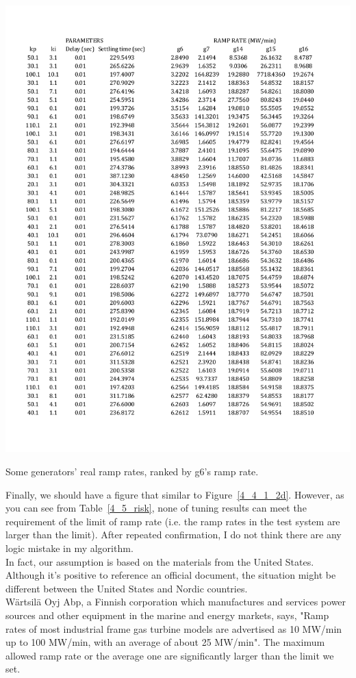 \begin{table}[htbp]
\centering
\includegraphics[width = \textwidth]{figure/4_5_risk.pdf}
\caption{Some generators' real ramp rates, ranked by g6's ramp rate.}
\label{4_5_risk}
\end{table}


Finally, we should have a figure that similar to Figure~\ref{4_4_1_2d}. However, as you can see from Table~\ref{4_5_risk}, none of tuning results can meet the requirement of the limit of ramp rate (i.e. the ramp rates in the test system are larger than the limit). After repeated confirmation, I do not think there are any logic mistake in my algorithm. \\

In fact, our assumption is based on the materials from the United States. Although it's positive to reference an official document, the situation might be different between the United States and Nordic countries.\\

Wärtsilä Oyj Abp, a Finnish corporation which manufactures and services power sources and other equipment in the marine and energy markets, says, \cite{Combustion} "Ramp rates of most industrial frame gas turbine models are advertised as 10 MW/min up to 100 MW/min, with an average of about 25 MW/min". The maximum allowed ramp rate or the average one are significantly larger than the limit we set.\\

